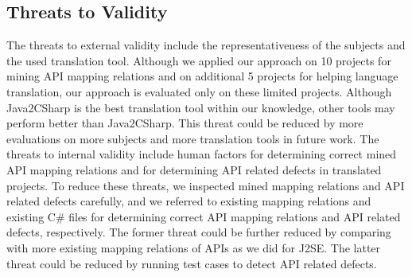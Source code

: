 \subsection{Threats to Validity}
\label{sec:evaluation:threats} The threats to external validity
include the representativeness of the subjects and
the used translation tool. Although we applied
our approach on 10 projects for mining API mapping relations and on additional
5 projects for helping language translation, our approach is
evaluated only on these limited projects. Although Java2CSharp is
the best translation tool within our knowledge, other tools may perform
better than Java2CSharp. This threat could be reduced by more
evaluations on more subjects and more translation tools in future
work. The threats to internal validity include human factors for
determining correct mined API mapping relations and for determining API related defects in
translated projects. To reduce these threats, we inspected mined
mapping relations and API related defects carefully, and we referred to existing
mapping relations and existing C\# files for determining correct API
mapping relations and API related defects, respectively. The former threat could be further
reduced by comparing with more existing mapping relations of APIs as we did for
J2SE. The latter threat could be reduced by running test cases to detect API related defects.

